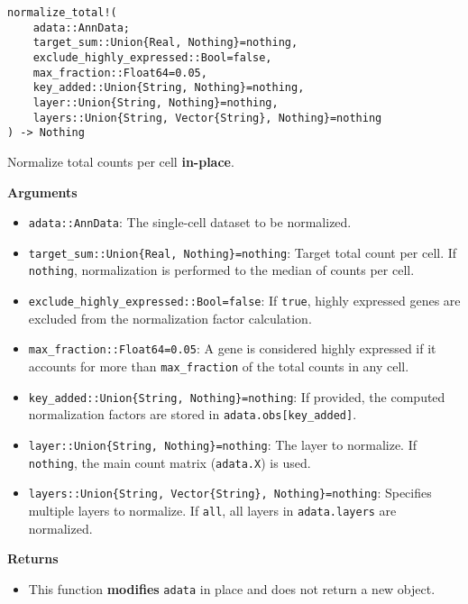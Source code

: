 \documentclass[oneside]{memoir}
\begin{document}
\begin{adjustwidth}{2em}{0pt}


\begin{verbatim}
normalize_total!(
    adata::AnnData;
    target_sum::Union{Real, Nothing}=nothing,
    exclude_highly_expressed::Bool=false,
    max_fraction::Float64=0.05,
    key_added::Union{String, Nothing}=nothing,
    layer::Union{String, Nothing}=nothing,
    layers::Union{String, Vector{String}, Nothing}=nothing
) -> Nothing
\end{verbatim}

Normalize total counts per cell \textbf{in-place}.

\textbf{Arguments}

\begin{itemize}
\item \texttt{adata::AnnData}: The single-cell dataset to be normalized.


\item \texttt{target\_sum::Union\{Real, Nothing\}=nothing}: Target total count per cell. If \texttt{nothing}, normalization is performed to the median of counts per cell.


\item \texttt{exclude\_highly\_expressed::Bool=false}: If \texttt{true}, highly expressed genes are excluded from the normalization factor calculation.


\item \texttt{max\_fraction::Float64=0.05}: A gene is considered highly expressed if it accounts for more than \texttt{max\_fraction} of the total counts in any cell.


\item \texttt{key\_added::Union\{String, Nothing\}=nothing}: If provided, the computed normalization factors are stored in \texttt{adata.obs[key\_added]}.


\item \texttt{layer::Union\{String, Nothing\}=nothing}: The layer to normalize. If \texttt{nothing}, the main count matrix (\texttt{adata.X}) is used.


\item \texttt{layers::Union\{String, Vector\{String\}, Nothing\}=nothing}: Specifies multiple layers to normalize. If \texttt{{\textquotedbl}all{\textquotedbl}}, all layers in \texttt{adata.layers} are normalized.

\end{itemize}
\textbf{Returns}

\begin{itemize}
\item This function \textbf{modifies} \texttt{adata} in place and does not return a new object.


\end{itemize}
\end{adjustwidth}
\end{document}
